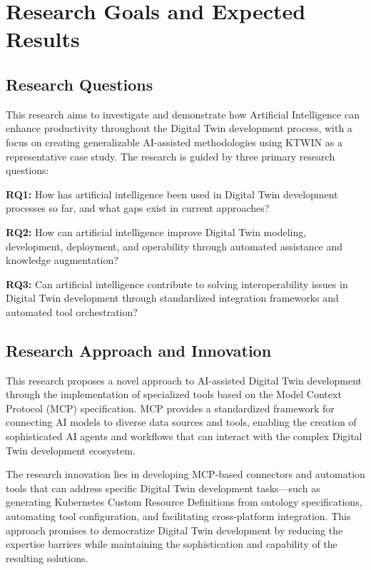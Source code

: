 
\chapter{Research Goals and Expected Results}
\label{chap:objectives}

\section{Research Questions}

This research aims to investigate and demonstrate how Artificial Intelligence can enhance productivity throughout the Digital Twin development process, with a focus on creating generalizable AI-assisted methodologies using KTWIN as a representative case study. The research is guided by three primary research questions:

\textbf{RQ1:} How has artificial intelligence been used in Digital Twin development processes so far, and what gaps exist in current approaches?

\textbf{RQ2:} How can artificial intelligence improve Digital Twin modeling, development, deployment, and operability through automated assistance and knowledge augmentation?

\textbf{RQ3:} Can artificial intelligence contribute to solving interoperability issues in Digital Twin development through standardized integration frameworks and automated tool orchestration?

\section{Research Approach and Innovation}

This research proposes a novel approach to AI-assisted Digital Twin development through the implementation of specialized tools based on the Model Context Protocol (MCP) specification. MCP provides a standardized framework for connecting AI models to diverse data sources and tools, enabling the creation of sophisticated AI agents and workflows that can interact with the complex Digital Twin development ecosystem.

The research innovation lies in developing MCP-based connectors and automation tools that can address specific Digital Twin development tasks—such as generating Kubernetes Custom Resource Definitions from ontology specifications, automating tool configuration, and facilitating cross-platform integration. This approach promises to democratize Digital Twin development by reducing the expertise barriers while maintaining the sophistication and capability of the resulting solutions.

